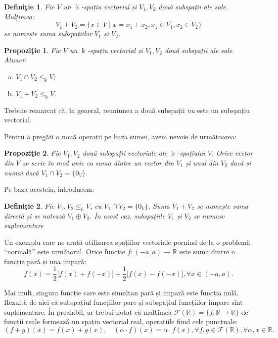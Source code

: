 \documentclass[11pt,a4paper]{article}
\newcommand\kal{\mathcal}
\theoremstyle{dotless}
\newtheorem{proposition}{Propozi\c{t}ie}[section]
\theoremstyle{dotlessdr}
\newtheorem{definition}{Defini\c{t}ie}[section]
\begin{document}
\begin{definition}
Fie $V$ un $\Bbbk$-spațiu vectorial și $V_1, V_2$ două subspații ale sale. 
Mulțimea: 
\[
V_1 + V_2 = \{ x \in V \mid x = x_1 + x_2, x_1 \in V_1, x_2 \in V_2 \}
\]
se numește \emph{suma subspațiilor} $V_1$ și $V_2$.
\end{definition}

\begin{proposition}
Fie $V$ un $\Bbbk$-spațiu vectorial și $V_1, V_2$ două subspații ale sale. 
Atunci:
\begin{enumerate}[(a)]
\item $V_1 \cap V_2 \leq_\Bbbk V$;
\item $V_1 + V_2 \leq_\Bbbk V$.
\end{enumerate}
\end{proposition}

Trebuie remarcat că, în general, reuniunea a două subspații \emph{nu} este un 
subspațiu vectorial.

Pentru a pregăti o nouă operații pe baza sumei, avem nevoie de următoarea:
\begin{proposition}
Fie $V_1, V_2$ două subspații vectoriale ale $\Bbbk$-spațiului $V$. Orice 
vector din $V$ se scrie în mod unic ca suma dintre un vector din $V_1$ și 
unul din $V_2$ dacă și numai dacă $V_1 \cap V_2 = \{ 0_V \}$.
\end{proposition}

Pe baza acesteia, introducem:
\begin{definition}

Fie $V_1, V_2 \leq_\Bbbk V$, cu $V_1 \cap V_2 = \{ 0_V \}$. Suma $V_1 + V_2$ se 
numește \emph{suma directă} și se notează $V_1 \oplus V_2$. În acest caz, 
subspațiile $V_1$ și $V_2$ se numesc \emph{suplementare}
\end{definition}

Un exemplu care ne arată utilizarea spațiilor vectoriale pornind de la o 
problemă \enquote{normală} este următorul. Orice funcție 
$f : (-a, a) \to \mathbb{R}$ este suma dintre o funcție pară și una impară: 
\[
f(x) = \dfrac{1}{2} \big[ f(x) + f(-x) \big] + \dfrac{1}{2} 
\big[ f(x) - f(-x) \big], \forall x \in (-a, a).
\]

Mai mult, singura funcție care este simultan pară și impară este funcția nulă. 
Rezultă de aici că subspațiul funcțiilor pare și subspațiul funcțiilor impare 
sînt suplementare. În prealabil, ar trebui notat că mulțimea 
$\mathcal{F}(\mathbb{R}) = \{f : \mathbb{R} \to \mathbb{R}\}$ de funcții 
reale formează un spațiu vectorial real, operațiile fiind cele punctuale: 
\[
(f + g)(x) = f(x) + g(x), \quad (\alpha \cdot f)(x) = \alpha \cdot f(x), 
\forall f,g \in \kal{F}(\mathbb{R}), \forall \alpha, x \in \mathbb{R}.
\]
\end{document}
